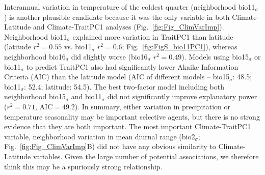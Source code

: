\documentclass[11pt, oneside]{article}
\begin{document}
Interannual variation in temperature of the coldest quarter (neighborhood bio11$_\sigma$) is another plausible candidate because it was the only variable in both Climate-Latitude and Climate-TraitPC1 analyses (Fig.~\ref{fig:Fig_ClimVarImp}). Neighborhood bio11$_\sigma$ explained more variation in TraitPC1 than latitude (latitude $r^2=0.55$ vs. bio11$_\sigma$ $r^2=0.6$; Fig.~\ref{fig:FigS_bio11PC1}), whereas neighborhood bio16$_\sigma$ did slightly worse (bio16$_\sigma$ $r^2=0.49$). Models using bio15$_\sigma$ or bio11$_\sigma$ to predict TraitPC1 also had significantly lower Akaike Information Criteria (AIC) than the latitude model (AIC of different models -- bio15$_\sigma$: 48.5; bio11$_\sigma$: 52.4; latitude: 54.5). The best two-factor model including both neighborhood bio15$_\sigma$ and bio11$_\sigma$ did not significantly improve explanatory power ($r^2=0.71$, AIC$=49.2$). In summary, either variation in precipitation or temperature seasonality may be important selective agents, but there is no strong evidence that they are both important. The most important Climate-TraitPC1 variable, neighborhood variation in mean diurnal range (bio2$_\sigma$; Fig.~\ref{fig:Fig_ClimVarImp}B) did not have any obvious similarity to Climate-Latitude variables. Given the large number of potential associations, we therefore think this may be a spuriously strong relationship.

\end{document}
